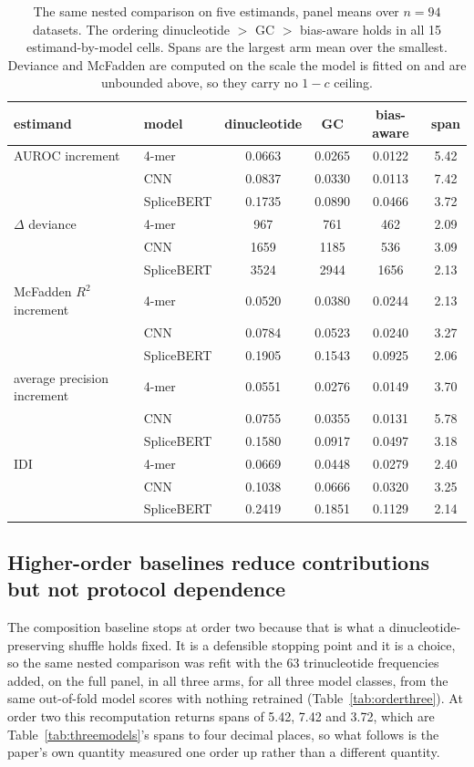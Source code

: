 \begin{table}[htbp]
\centering
\caption{The same nested comparison on five estimands, panel means over $n=94$ datasets. The
ordering dinucleotide $>$ GC $>$ bias-aware holds in all 15 estimand-by-model cells. Spans are
the largest arm mean over the smallest. Deviance and McFadden are computed on the scale the
model is fitted on and are unbounded above, so they carry no $1-c$ ceiling.}
\label{tab:estimands}
\small
\begin{tabular}{llcccc}
\toprule
estimand & model & dinucleotide & GC & bias-aware & span \\
\midrule
AUROC increment & 4-mer & 0.0663 & 0.0265 & 0.0122 & 5.42 \\
 & CNN & 0.0837 & 0.0330 & 0.0113 & 7.42 \\
 & SpliceBERT & 0.1735 & 0.0890 & 0.0466 & 3.72 \\
\midrule
$\Delta$ deviance & 4-mer & 967 & 761 & 462 & 2.09 \\
 & CNN & 1659 & 1185 & 536 & 3.09 \\
 & SpliceBERT & 3524 & 2944 & 1656 & 2.13 \\
\midrule
McFadden $R^2$ increment & 4-mer & 0.0520 & 0.0380 & 0.0244 & 2.13 \\
 & CNN & 0.0784 & 0.0523 & 0.0240 & 3.27 \\
 & SpliceBERT & 0.1905 & 0.1543 & 0.0925 & 2.06 \\
\midrule
average precision increment & 4-mer & 0.0551 & 0.0276 & 0.0149 & 3.70 \\
 & CNN & 0.0755 & 0.0355 & 0.0131 & 5.78 \\
 & SpliceBERT & 0.1580 & 0.0917 & 0.0497 & 3.18 \\
\midrule
IDI & 4-mer & 0.0669 & 0.0448 & 0.0279 & 2.40 \\
 & CNN & 0.1038 & 0.0666 & 0.0320 & 3.25 \\
 & SpliceBERT & 0.2419 & 0.1851 & 0.1129 & 2.14 \\
\bottomrule
\end{tabular}
\end{table}

\subsection{Higher-order baselines reduce contributions but not protocol dependence}
\label{sec:orderthree}

The composition baseline stops at order two because that is what a dinucleotide-preserving
shuffle holds fixed. It is a defensible stopping point and it is a choice, so the same nested
comparison was refit with the 63 trinucleotide frequencies added, on the full panel, in all
three arms, for all three model classes, from the same out-of-fold model scores with nothing
retrained (Table~\ref{tab:orderthree}). At order two this recomputation returns spans of
5.42, 7.42 and 3.72, which are Table~\ref{tab:threemodels}'s spans to four decimal places, so
what follows is the paper's own quantity measured one order up rather than a different
quantity.

